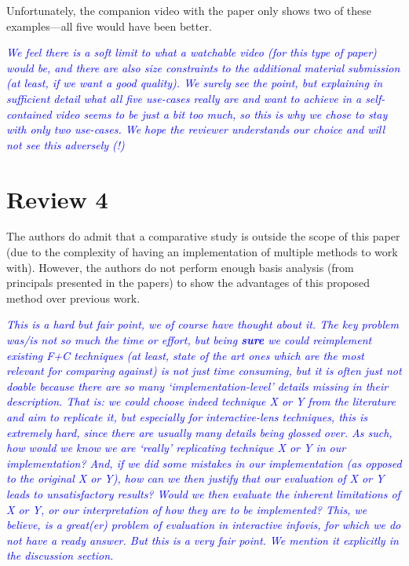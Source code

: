 \documentclass[a4paper,10pt]{article}
\newcommand{\rr}[1]{\emph{\textcolor{blue}{#1}}}
\begin{document}
    Unfortunately, the companion video with the paper
    only shows two of these examples---all five would have been better.
    
    \rr{We feel there is a soft limit to what a watchable video (for this type of paper) would be, and there are also size constraints to the additional material submission (at least, if we want a good quality). We surely see the point, but explaining in sufficient detail what all five use-cases really are and want to achieve in a self-contained video seems to be just a bit too much, so this is why we chose to stay with only two use-cases. We hope the reviewer understands our choice and will not see this adversely (!)}\\
    

\section{Review 4}

    The authors do admit that a comparative study
    is outside the scope of this paper (due to the complexity of having an
    implementation of multiple methods to work with). However, the authors do not
    perform enough basis analysis (from principals presented in the papers) to show
    the advantages of this proposed method over previous work.
    
    \rr{This is a hard but fair point, we of course have thought about it. The key problem was/is not so much the time or effort, but being \textbf{sure} we could reimplement existing F+C techniques (at least, state of the art ones which are the most relevant for comparing against) is not just time consuming, but it is often just not doable because there are so many `implementation-level' details missing in their description. That is: we could choose indeed technique X or Y from the literature and aim to replicate it, but especially for interactive-lens techniques, this is extremely hard, since there are usually many details being glossed over. As such, how would we know we are `really' replicating technique X or Y in our implementation? And, if we did some mistakes in our implementation (as opposed to the original X or Y), how can we then justify that our evaluation of X or Y leads to unsatisfactory results? Would we then evaluate the inherent limitations of X or Y, or our interpretation of how they are to be implemented? This, we believe, is a great(er) problem of evaluation in interactive infovis, for which we do not have a ready answer. But this is a very fair point. We mention it explicitly in the discussion section.}\\
    
\end{document}
